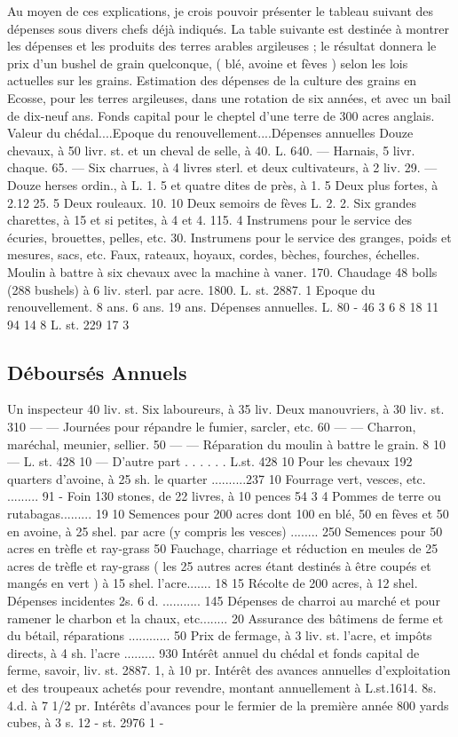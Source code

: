 Au moyen de ces explications, je crois pouvoir présenter le tableau suivant des dépenses sous divers chefs déjà indiqués.
La table suivante est destinée à montrer les dépenses et les produits des terres arables argileuses ; le résultat donnera le prix d'un bushel de grain quelconque, ( blé, avoine et fèves ) selon les lois actuelles sur les grains.
Estimation des dépenses de la culture des grains en Ecosse, pour les terres argileuses, dans une rotation de six années, et avec un bail de dix-neuf ans.
Fonds capital pour le cheptel d'une terre de 300 acres anglais.
\setcounter{page}{311}
Valeur du chédal....Epoque du renouvellement....Dépenses annuelles
Douze chevaux, à 50 livr. st.
et un cheval de selle, à 40. L. 640. —
Harnais, 5 livr. chaque. 65. —
Six charrues, à 4 livres sterl.
et deux cultivateurs, à 2 liv. 29. —
Douze herses ordin., à L. 1. 5
et quatre dites de près, à 1. 5
Deux plus fortes, à 2.12 25. 5
Deux rouleaux. 10. 10
Deux semoirs de fèves L. 2. 2.
Six grandes charettes, à 15
et si petites, à 4 et 4. 115. 4
Instrumens pour le service des écuries, brouettes, pelles, etc. 30.
Instrumens pour le service des granges, poids et mesures, sacs, etc.
Faux, rateaux, hoyaux, cordes, bèches, fourches, échelles.
Moulin à battre à six chevaux avec la machine à vaner. 170.
Chaudage 48 bolls (288 bushels) à 6 liv. sterl. par acre. 1800.
L. st. 2887. 1
Epoque du renouvellement. 8 ans.
6 ans.
19 ans.
Dépenses annuelles. L. 80 - 46 3 6
8 18 11
94 14 8
L. st. 229 17 3
\subsection{Déboursés Annuels}
Un inspecteur 40 liv. st. Six laboureurs, à 35 liv. Deux manouvriers, à 30 liv. st. 310 — —
Journées pour répandre le fumier, sarcler, etc. 60 — —
Charron, maréchal, meunier, sellier. 50 — —
Réparation du moulin à battre le grain. 8 10 —
L. st. 428 10 —
\setcounter{page}{312}
D'autre part . . . . . . L.st. 428 10 Pour les chevaux 192 quarters d'avoine, à 25 sh. le quarter ..........237 10
Fourrage vert, vesces, etc. ......... 91 - Foin 130 stones, de 22 livres, à 10 pences 54 3 4
Pommes de terre ou rutabagas......... 19 10
Semences pour 200 acres dont 100 en blé, 50 en fèves et 50 en avoine, à 25 shel. par acre (y compris les vesces) ........ 250
Semences pour 50 acres en trèfle et ray-grass 50
Fauchage, charriage et réduction en meules de 25 acres de trèfle et ray-grass ( les 25 autres acres étant destinés à être coupés et mangés en vert ) à 15 shel. l'acre....... 18 15 
Récolte de 200 acres, à 12 shel. Dépenses incidentes 2s. 6 d. ........... 145
Dépenses de charroi au marché et pour ramener le charbon et la chaux, etc........ 20
Assurance des bâtimens de ferme et du bétail, réparations ............ 50
Prix de fermage, à 3 liv. st. l'acre, et impôts directs, à 4 sh. l'acre ......... 930
Intérêt annuel du chédal et fonds capital de ferme, savoir, liv. st. 2887. 1, à 10 pr. %
Intérêt des avances annuelles d'exploitation et des troupeaux achetés pour revendre, montant annuellement à L.st.1614. 8s. 4.d. à 7 1/2 pr. %
Intérêts d'avances pour le fermier de la première année 800 yards cubes, à 3 s. 12 - st. 2976 1 -
\setcounter{page}{313} 
